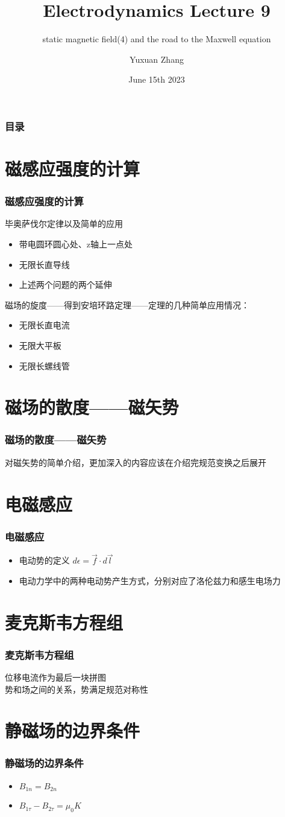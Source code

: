\documentclass[10pt]{beamer}
\title[About Beamer] %
{Electrodynamics Lecture 9}
\subtitle{ static magnetic field(4) and the  road to the Maxwell equation }
\author %
{Yuxuan Zhang }
\institute[VFU] %
{
  School of Physics \quad
  Zhejiang University
}
\date[VLC 2021] %
{June 15th 2023}
\begin{document}
\frame{\titlepage}

\begin{frame}
    \frametitle{目录}
    \tableofcontents
\end{frame}


\section{磁感应强度的计算}
\begin{frame}
    \frametitle{磁感应强度的计算}
    毕奥萨伐尔定律以及简单的应用
    \begin{itemize}
        \item 带电圆环圆心处、z轴上一点处
        \item 无限长直导线
        \item 上述两个问题的两个延伸
    \end{itemize}

    磁场的旋度——得到安培环路定理——定理的几种简单应用情况：
    \begin{itemize}
        \item 无限长直电流
        \item 无限大平板
        \item 无限长螺线管
    \end{itemize}
\end{frame}

\section{磁场的散度——磁矢势}
\begin{frame}
    \frametitle{磁场的散度——磁矢势}
    对磁矢势的简单介绍，更加深入的内容应该在介绍完规范变换之后展开
\end{frame}


\section{电磁感应}
\begin{frame}
    \frametitle{电磁感应}
    \begin{itemize}
    \item 电动势的定义 $d\epsilon  = \vec{f} \cdot d\vec{l}$
    \item 电动力学中的两种电动势产生方式，分别对应了洛伦兹力和感生电场力
    \end{itemize}
\end{frame}

\section{麦克斯韦方程组}
\begin{frame}
    \frametitle{麦克斯韦方程组}
    位移电流作为最后一块拼图\\
    势和场之间的关系，势满足规范对称性
\end{frame}


\section{静磁场的边界条件}
\begin{frame}
    \frametitle{静磁场的边界条件}
    \begin{itemize}
\item    $B_{1n} = B_{2n}$ 
\item    $B_{1\tau} - B_{2\tau} = \mu_0 K$
    \end{itemize}
\end{frame}
\end{document}
